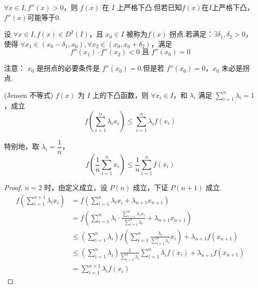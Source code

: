 $\forall x \in I, f''(x) > 0$，则 $f(x)$ 在 $I$ 上严格下凸.但若已知$f(x)$在$I$上严格下凸，$f''(x) $可能等于$0$.
\begin{definition}
	设 $\forall x \in I, f(x) \in D^2(I)$，且 $x_0 \in I$ 被称为$f(x)$ 拐点.若满足：$\exists \delta_1, \delta_2 > 0$，使得 $\forall x_1 \in (x_0 - \delta_1, x_0), \forall x_2 \in (x_0, x_0 + \delta_2)$，满足
	$$
	f''(x_1) \cdot f''(x_2) < 0 \text{ 且 } f''(x_0) = 0
	$$
	
	
\end{definition}
注意： $x_0$ 是拐点的必要条件是 $f''(x_0) = 0$.但是若 $f''(x_0) = 0$，$x_0$ 未必是拐点.
\begin{proposition}
	(Jensen 不等式)
	$f(x)$ 为 $I$ 上的下凸函数，则 $\forall x_i \in I$，和 $\lambda_i$ 满足 $\sum\limits_{i=1}^n \lambda_i = 1$，成立
	$$
	f\left(\sum_{i=1}^n \lambda_i x_i\right) \leqslant \sum_{i=1}^n \lambda_i f(x_i)
	$$
	
	特别地，取 $\lambda_i = \dfrac{1}{n}$，
	$$
	f\left(\frac{1}{n} \sum_{i=1}^n x_i\right) \leqslant \frac{1}{n} \sum_{i=1}^n f(x_i)
	$$
	
	
\end{proposition}
\begin{proof}
	$n=2$ 时，由定义成立，设 $P(n)$ 成立，下证 $P(n+1)$ 成立.
	$$\begin{aligned}
		f\left(\sum_{i=1}^{n+1} \lambda_i x_i\right) & =f\left(\sum_{i=1}^n \lambda_i x_i+\lambda_{n+1} x_{n+1}\right) \\
		& =f\left(\sum_{i=1}^n \lambda_i \cdot \frac{\sum_{i=1}^n \lambda_i x_i}{\sum_{i=1}^n \lambda_i}+\lambda_{n+1} x_{n+1}\right) \\
		& \leqslant\left(\sum_{i=1}^n \lambda_i\right) f\left(\sum_{i=1}^n \frac{\lambda_i}{\sum_{i=1}^n \lambda_i} x_i\right)+\lambda_{n+1} f\left(x_{n+1}\right) \\
		& \leqslant\left(\sum_{i=1}^n \lambda_i\right) \frac{1}{\sum_{i=1}^n \lambda_i} \sum_{i=1}^n \lambda_i f\left(x_i\right)+\lambda_{n+1} f\left(x_{n+1}\right) \\
		& =\sum_{i=1}^{n+1} \lambda_i f\left(x_i\right)
	\end{aligned}$$
	
	
\end{proof}
\newpage
